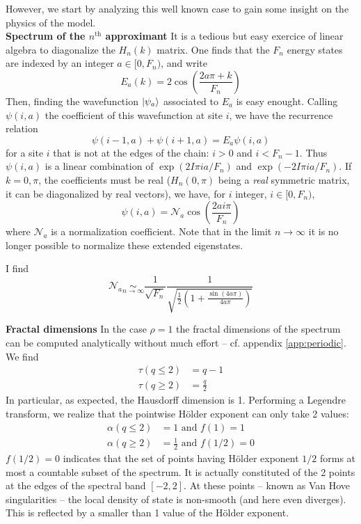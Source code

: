 \documentclass[11pt]{article}
\numberwithin{equation}{section}
\newcommand{\simlim}[2]{\ensuremath{ \underset{#1 \rightarrow #2}{\sim} }}
\newcommand{\nth}{$n^\text{th}$}
\begin{document}
However, we start by analyzing this well known case to gain some insight on the physics of the model.
\\

\textbf{Spectrum of the \nth{} approximant}
It is a tedious but easy exercice of linear algebra to diagonalize the $H_n(k)$ matrix.
One finds that the $F_n$ energy states are indexed by an integer $a \in [0, F_n)$, and write
\begin{equation}
	E_a(k) = 2 \cos \left( \frac{2 a \pi + k}{F_n} \right)
\end{equation}
Then, finding the wavefunction $\ket{\psi_a}$ associated to $E_a$ is easy enought. Calling $\psi(i,a)$ the coefficient of this wavefunction at site $i$, we have the recurrence relation
\begin{equation}
	\psi(i-1,a) + \psi(i+1,a) = E_a \psi(i,a)
\end{equation}
for a site $i$ that is not at the edges of the chain: $i > 0$ and $i < F_n -1$.
Thus $\psi(i,a)$ is a linear combination of $\exp( 2 I \pi i a/F_n )$ and $\exp( -2 I \pi i a/F_n )$. 
If $k = 0, \pi$, the coefficients must be real ($H_n(0,\pi)$ being a \emph{real} symmetric matrix, it can be diagonalized by real vectors), we have, for $i$ integer, $i \in [0, F_n)$,
\begin{equation}
	\psi(i,a) = \mathcal{N}_a \cos \left( \frac{2 a i \pi}{F_n} \right)
\end{equation}
where $\mathcal{N}_a$ is a normalization coefficient. Note that in the limit $n \rightarrow \infty$ it is no longer possible to normalize these extended eigenstates.

I find
\begin{equation}
	\mathcal{N}_a \simlim{n}{\infty} \frac{1}{\sqrt{F_n}} \frac{1}{\sqrt{\frac{1}{2}\left( 1 + \frac{\sin(4 a \pi)}{4 a \pi} \right)}}
\end{equation}

\textbf{Fractal dimensions}
In the case $\rho = 1$ the fractal dimensions of the spectrum can be computed analytically without much effort -- cf. appendix \ref{app:periodic}. 
We find
\begin{align}
	\tau(q \leq 2) &= q-1 \\
	\tau(q \geq 2) &= \frac{q}{2}
\end{align}
In particular, as expected, the Hausdorff dimension is 1. Performing a Legendre transform, we realize that the pointwise Hölder exponent can only take 2 values:
\begin{align}
	\alpha(q \leq 2) &= 1 \text{~and~} f(1) = 1\\
	\alpha(q \geq 2) &= \frac{1}{2} \text{~and~} f(1/2) = 0
\end{align}
$f(1/2) = 0$ indicates that the set of points having Hölder exponent $1/2$ forms at most a countable subset of the spectrum.
It is actually constituted of the 2 points at the edges of the spectral band $[-2,2]$. At these points -- known as Van Hove singularities -- the local density of state is non-smooth (and here even diverges). This is reflected by a smaller than 1 value of the Hölder exponent.
\end{document}
